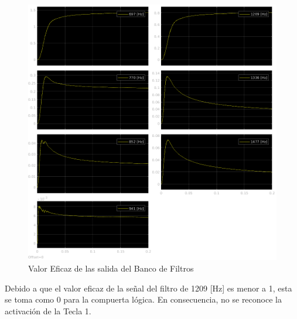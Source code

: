\begin{figure}[H]
  \centering
  \includegraphics[width=\linewidth]{images/simulacion/fallas/rms/1.png}
  \caption{Valor Eficaz de las salida del Banco de Filtros }
  \label{fig:num_1_rms}
\end{figure}

Debido a que el valor eficaz de la señal del filtro de 1209 [Hz] es menor a 1, esta se toma como 0 para la compuerta lógica. En consecuencia, no se reconoce la activación de la Tecla 1.


